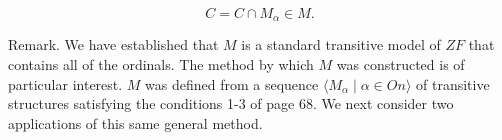 $$C = C \cap M_{\alpha} \in M.$$

Remark. We have established that $M$ is a standard transitive model of $ZF$ that contains all of the ordinals. The method by which $M$ was constructed is of particular interest. $M$ was defined from a sequence $\langle M_{\alpha} \mid \alpha \in On \rangle$ of transitive structures satisfying the conditions 1-3 of page 68. We next consider two applications of this same general method.
